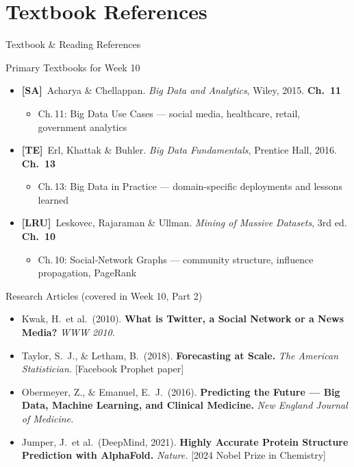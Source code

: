 \documentclass[aspectratio=169,10pt]{beamer}
\begin{document}
\section*{Textbook References}

\begin{frame}{Textbook \& Reading References}
  \begin{block}{Primary Textbooks for Week 10}
    \begin{itemize}
      \item \textbf{[SA]}\ Acharya \& Chellappan. \textit{Big Data and Analytics}, Wiley, 2015.
            \hfill\textbf{Ch.\ 11}
            \begin{itemize}
              \small\item Ch.\,11: Big Data Use Cases --- social media, healthcare, retail, government analytics
            \end{itemize}
      \item \textbf{[TE]}\ Erl, Khattak \& Buhler. \textit{Big Data Fundamentals}, Prentice Hall, 2016.
            \hfill\textbf{Ch.\ 13}
            \begin{itemize}
              \small\item Ch.\,13: Big Data in Practice --- domain-specific deployments and lessons learned
            \end{itemize}
      \item \textbf{[LRU]}\ Leskovec, Rajaraman \& Ullman. \textit{Mining of Massive Datasets}, 3rd ed.
            \hfill\textbf{Ch.\ 10}
            \begin{itemize}
              \small\item Ch.\,10: Social-Network Graphs --- community structure, influence propagation, PageRank
            \end{itemize}
    \end{itemize}
  \end{block}
  \vspace{4pt}
  \begin{exampleblock}{Research Articles (covered in Week 10, Part 2)}
    \begin{itemize}
      \small
      \item Kwak, H.\ et al.\ (2010). \textbf{What is Twitter, a Social Network or a News Media?} \textit{WWW 2010.}
      \item Taylor, S.\ J., \& Letham, B.\ (2018). \textbf{Forecasting at Scale.} \textit{The American Statistician.} [Facebook Prophet paper]
      \item Obermeyer, Z., \& Emanuel, E.\ J.\ (2016). \textbf{Predicting the Future --- Big Data, Machine Learning, and Clinical Medicine.} \textit{New England Journal of Medicine.}
      \item Jumper, J.\ et al.\ (DeepMind, 2021). \textbf{Highly Accurate Protein Structure Prediction with AlphaFold.} \textit{Nature.} [2024 Nobel Prize in Chemistry]
    \end{itemize}
  \end{exampleblock}
\end{frame}
\end{document}

